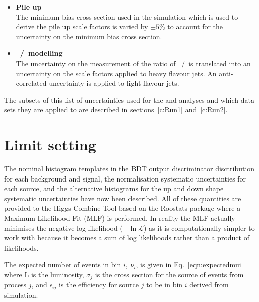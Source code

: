 \begin{itemize}
\item \textbf{Pile up}\\
The minimum bias cross section used in the simulation which is used to derive the pile up scale factors is varied by $\pm 5\%$ to account for the uncertainty on the minimum bias cross section. 

\item \textbf{\heavyflavourone~/~\heavyflavourtwo modelling}\\
The uncertainty on the measurement of the ratio of \heavyflavourone~/~\heavyflavourtwo is translated into an uncertainty on the scale factors applied to heavy flavour jets. An anti-correlated uncertainty is applied to light flavour jets.

\end{itemize}

The subsets of this list of uncertainties used for the \runone and \runtwo analyses and which data sets they are applied to are described in sections~\ref{c:Run1} and~\ref{c:Run2}. 


\section{Limit setting \label{sec:limitFit}}
The nominal histogram templates in the BDT output discriminator disctribution for each background and signal, the normalisation systematic uncertainties for each source, and the alternative histograms for the up and down shape systematic uncertainties have now been described. All of these quantities are provided to the Higgs Combine Tool based on the Roostats package where a Maximum Likelihood Fit (MLF) is performed. In reality the MLF actually minimises the negative log likelihood ($-\ln\mathcal{L}$) as it is computationally simpler to work with because it becomes a sum of log likelihoods rather than a product of likelihoods.

The expected number of events in bin $i$, $\nu_{i}$, is given in Eq.~\ref{eqn:expectedmui} where L is the luminosity, $\sigma_{j}$ is the cross section for the source of events from process $j$, and $\epsilon_{ij}$ is the efficiency for source $j$ to be in bin $i$ derived from simulation.

